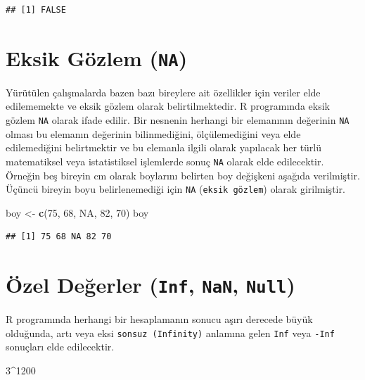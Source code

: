 \documentclass[
]{book}
\newenvironment{Shaded}{\begin{snugshade}}{\end{snugshade}}
\newcommand{\ConstantTok}[1]{\textcolor[rgb]{0.56,0.35,0.01}{#1}}
\newcommand{\DecValTok}[1]{\textcolor[rgb]{0.00,0.00,0.81}{#1}}
\newcommand{\FunctionTok}[1]{\textcolor[rgb]{0.13,0.29,0.53}{\textbf{#1}}}
\newcommand{\NormalTok}[1]{#1}
\newcommand{\OtherTok}[1]{\textcolor[rgb]{0.56,0.35,0.01}{#1}}
\newcommand{\SpecialCharTok}[1]{\textcolor[rgb]{0.81,0.36,0.00}{\textbf{#1}}}
\begin{document}
\begin{verbatim}
## [1] FALSE
\end{verbatim}

\section{\texorpdfstring{Eksik Gözlem (\texttt{NA})}{Eksik Gözlem (NA)}}\label{eksik-guxf6zlem-na}

Yürütülen çalışmalarda bazen bazı bireylere ait özellikler için veriler elde edilememekte ve eksik gözlem olarak belirtilmektedir. R programında eksik gözlem \texttt{NA} olarak ifade edilir. Bir nesnenin herhangi bir elemanının değerinin \texttt{NA} olması bu elemanın değerinin bilinmediğini, ölçülemediğini veya elde edilemediğini belirtmektir ve bu elemanla ilgili olarak yapılacak her türlü matematiksel veya istatistiksel işlemlerde sonuç \texttt{NA} olarak elde edilecektir. Örneğin beş bireyin cm olarak boylarını belirten boy değişkeni aşağıda verilmiştir. Üçüncü bireyin boyu belirlenemediği için \texttt{NA} (\texttt{eksik\ gözlem}) olarak girilmiştir.

\begin{Shaded}
\begin{Highlighting}[]
\NormalTok{boy }\OtherTok{\textless{}{-}} \FunctionTok{c}\NormalTok{(}\DecValTok{75}\NormalTok{, }\DecValTok{68}\NormalTok{, }\ConstantTok{NA}\NormalTok{, }\DecValTok{82}\NormalTok{, }\DecValTok{70}\NormalTok{)}
\NormalTok{boy}
\end{Highlighting}
\end{Shaded}

\begin{verbatim}
## [1] 75 68 NA 82 70
\end{verbatim}

\section{\texorpdfstring{Özel Değerler (\texttt{Inf}, \texttt{NaN}, \texttt{Null})}{Özel Değerler (Inf, NaN, Null)}}\label{uxf6zel-deux11ferler-inf-nan-null}

R programında herhangi bir hesaplamanın sonucu aşırı derecede büyük olduğunda, artı veya eksi \texttt{sonsuz\ (Infinity)} anlamına gelen \texttt{Inf} veya \texttt{-Inf} sonuçları elde edilecektir.

\begin{Shaded}
\begin{Highlighting}[]
\DecValTok{3}\SpecialCharTok{\^{}}\DecValTok{1200}
\end{Highlighting}
\end{Shaded}
\end{document}
